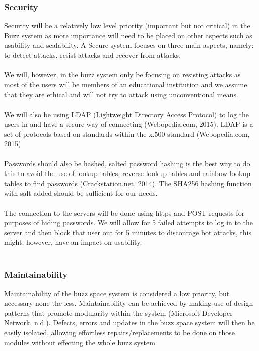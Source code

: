 \subsubsection{Security}
Security will be a relatively low level priority (important but not critical) in the Buzz system as more importance will need to be placed on other aspects such as usability and scalability. A Secure system focuses on three main aspects, namely: to detect attacks, resist attacks and recover from attacks.\\
\\
We will, however, in the buzz system only be focusing on resisting attacks as most of the users will be members of an educational institution and we assume that they are ethical and will not try to attack using unconventional means.\\
\\
We will also be using LDAP (Lightweight Directory Access Protocol) to log the users in and have a secure way of connecting (Webopedia.com, 2015). LDAP is a set of protocols based on standards within the x.500 standard (Webopedia.com, 2015)\\
\\
Passwords should also be hashed, salted password hashing is the best way to do this to avoid the use of lookup tables, reverse lookup tables and rainbow lookup tables to find passwords (Crackstation.net, 2014). The SHA256 hashing function with salt added should be sufficient for our needs.\\
\\
The connection to the servers will be done using https and POST requests for purposes of hiding passwords. We will allow for 5 failed attempts to log in to the server and then block that user out for 5 minutes to discourage bot attacks, this might, however, have an impact on usability.\\
\\
\subsubsection{Maintainability}
Maintainability of the buzz space system is considered a low priority, but necessary none the less. Maintainability can be achieved by making use of design patterns that promote modularity within the system (Microsoft Developer Network, n.d.). Defects, errors and updates in the buzz space system will then be easily isolated, allowing effortless repairs/replacements to be done on those modules without effecting the whole buzz system.\\
\\

